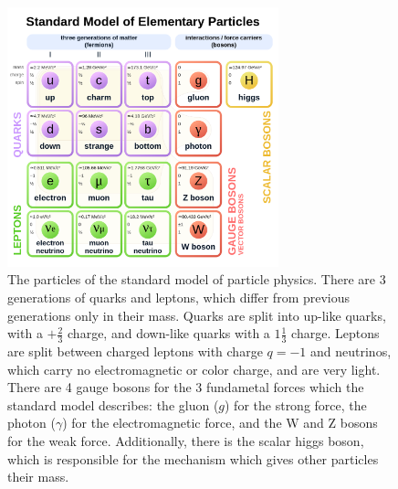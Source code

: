 \begin{figure}[h!]
    \centering
    \includegraphics[width=0.7\textwidth]{figures/Standard_Model_of_Elementary_Particles.svg.png}
    \caption{The particles of the standard model of particle physics. There are 3 generations of quarks and leptons, which differ from previous generations only in their mass. Quarks are split into up-like quarks, with a $+\frac{2}{3}$ charge, and down-like quarks with a $1\frac{1}{3}$ charge. Leptons are split between charged leptons with charge $q=-1$ and neutrinos, which carry no electromagnetic or color charge, and are very light. There are 4 gauge bosons for the 3 fundametal forces which the standard model describes: the gluon ($g$) for the strong force, the photon ($\gamma$) for the electromagnetic force, and the W and Z bosons for the weak force. Additionally, there is the scalar higgs boson, which is responsible for the mechanism which gives other particles their mass.}
    \label{fig:StandardModelParticles}
\end{figure}


